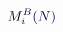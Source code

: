 \documentclass[12pt]{article}
\begin{document}
\makeatletter
\renewcommand*{\@textcolor}[3]{%
  \protect\leavevmode
  \begingroup
    \color#1{#2}#3%
  \endgroup
}
\makeatother
\begin{displaymath}
\mathcolor[RGB]{0,0,15}{M} _ { \mathcolor[RGB]{0,0,30}{i} } ^ { \mathcolor[RGB]{0,0,45}{B} } \mathcolor[RGB]{0,0,60}{(} \mathcolor[RGB]{0,0,75}{N} \mathcolor[RGB]{0,0,90}{)}
\end{displaymath}
\end{document}
